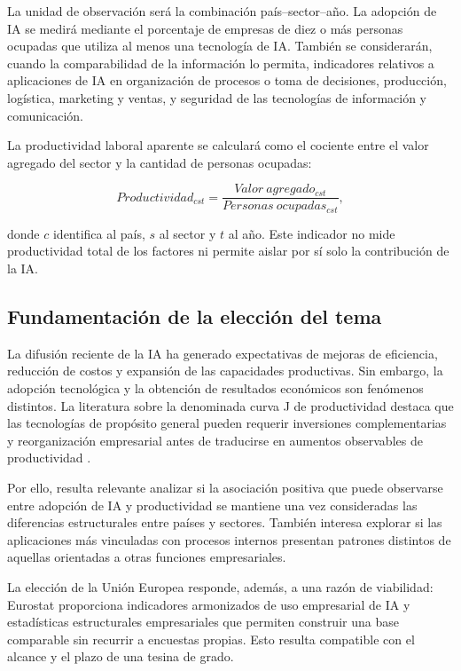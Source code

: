 \documentclass[12pt,a4paper]{article}
\begin{document}
La unidad de observación será la combinación país--sector--año. La adopción de IA se medirá mediante el porcentaje de empresas de diez o más personas ocupadas que utiliza al menos una tecnología de IA. También se considerarán, cuando la comparabilidad de la información lo permita, indicadores relativos a aplicaciones de IA en organización de procesos o toma de decisiones, producción, logística, marketing y ventas, y seguridad de las tecnologías de información y comunicación.

La productividad laboral aparente se calculará como el cociente entre el valor agregado del sector y la cantidad de personas ocupadas:

\begin{equation}
  Productividad_{cst} =
  \frac{Valor\ agregado_{cst}}{Personas\ ocupadas_{cst}},
\end{equation}

donde $c$ identifica al país, $s$ al sector y $t$ al año. Este indicador no mide productividad total de los factores ni permite aislar por sí solo la contribución de la IA.

\subsection{Fundamentación de la elección del tema}

La difusión reciente de la IA ha generado expectativas de mejoras de eficiencia, reducción de costos y expansión de las capacidades productivas. Sin embargo, la adopción tecnológica y la obtención de resultados económicos son fenómenos distintos. La literatura sobre la denominada curva J de productividad destaca que las tecnologías de propósito general pueden requerir inversiones complementarias y reorganización empresarial antes de traducirse en aumentos observables de productividad \citep{brynjolfsson2021productivity}.

Por ello, resulta relevante analizar si la asociación positiva que puede observarse entre adopción de IA y productividad se mantiene una vez consideradas las diferencias estructurales entre países y sectores. También interesa explorar si las aplicaciones más vinculadas con procesos internos presentan patrones distintos de aquellas orientadas a otras funciones empresariales.

La elección de la Unión Europea responde, además, a una razón de viabilidad: Eurostat proporciona indicadores armonizados de uso empresarial de IA y estadísticas estructurales empresariales que permiten construir una base comparable sin recurrir a encuestas propias. Esto resulta compatible con el alcance y el plazo de una tesina de grado.
\end{document}
